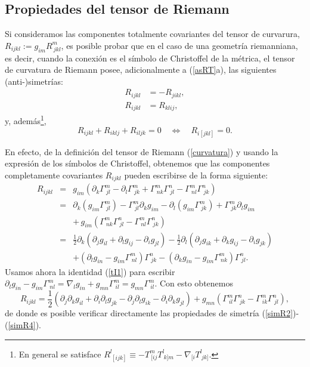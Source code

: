 \subsection{Propiedades del tensor de Riemann}
Si consideramos las componentes totalmente covariantes del tensor de curvarura, $R_{ijkl}:=g_{im}R^m_{\ jkl}$, es posible probar que en el caso de una geometría riemanniana, es decir, cuando la conexión es el símbolo de Christoffel de la métrica, el tensor de curvatura de Riemann posee, adicionalmente a (\ref{asRT}a), las siguientes (anti-)simetrías:
\begin{align}
R_{ijkl} & =-R_{jikl},\label{simR2}\\
R_{ijkl} & =R_{klij}, \label{simR3}
\end{align}
y, además\footnote{En general se satisface $R^l_{\ [ijk]}\equiv -T^m_{\ [ij}T^l_{\ k]m}-\nabla_{[i}T^l_{\ jk]}$.},
\begin{equation}
R_{ijkl}+R_{iklj}+R_{iljk}=0\quad\Leftrightarrow\quad
R_{i[jkl]}=0. \label{simR4}
\end{equation}

En efecto, de la definición del tensor de Riemann (\ref{curvatura}) y usando la expresión de los símbolos de Christoffel, obtenemos que las componentes completamente covariantes $R_{ijkl}$ pueden escribirse de la forma siguiente:
\begin{eqnarray}
 R_{ijkl}&=&g_{im}\left(\partial_k\Gamma^m_{\ jl}-\partial_l\Gamma^m_{\ jk}+\Gamma^m_{\ nk}\Gamma^n_{\ jl}-\Gamma^m_{\ nl}\Gamma^n_{\ jk}\right) \\
&=&\partial_k\left(g_{im}\Gamma^m_{\ jl}\right)-\Gamma^m_{\ jl}\partial_k g_{im}-\partial_l\left(g_{im}\Gamma^m_{\ jk}\right)+\Gamma^m_{\ jk}\partial_l g_{im} \nonumber\\
&&+\,g_{im}\left(\Gamma^m_{\ nk}\Gamma^n_{\ jl}-\Gamma^m_{\ nl}\Gamma^n_{\ jk}\right) \\
&=&\frac{1}{2}\partial_k\left(\partial_jg_{il}+\partial_lg_{ij}-\partial_ig_{jl}\right)-\frac{1}{2}\partial_l\left(\partial_jg_{ik}+\partial_kg_{ij}-\partial_ig_{jk}\right)\nonumber\\
&&+\left(\partial_lg_{in}-g_{im}\Gamma^m_{\ nl}\right)\Gamma^n_{\ jk}-\left(\partial_kg_{in}-g_{im}\Gamma^m_{\ nk}\right)\Gamma^n_{\ jl}.
\end{eqnarray}
Usamos ahora la identidad (\ref{tI1}) para escribir $\partial_lg_{in}-g_{im}\Gamma^m_{\ nl}=\nabla_lg_{in}+g_{mn}\Gamma^m_{\ il}= g_{mn}\Gamma^m_{\ il}$. Con esto obtenemos
\begin{equation}
 R_{ijkl}=\frac{1}{2}\left(\partial_j\partial_kg_{il}+\partial_i\partial_lg_{jk}-\partial_j\partial_lg_{ik}-\partial_i\partial_kg_{jl}\right) + g_{mn}\left(\Gamma^m_{\ il}\Gamma^n_{\ jk}-\Gamma^m_{\ ik}\Gamma^n_{\ jl}\right), \label{Rdddd}
\end{equation}
de donde es posible verificar directamente las propiedades de simetría (\ref{simR2})-(\ref{simR4}).

